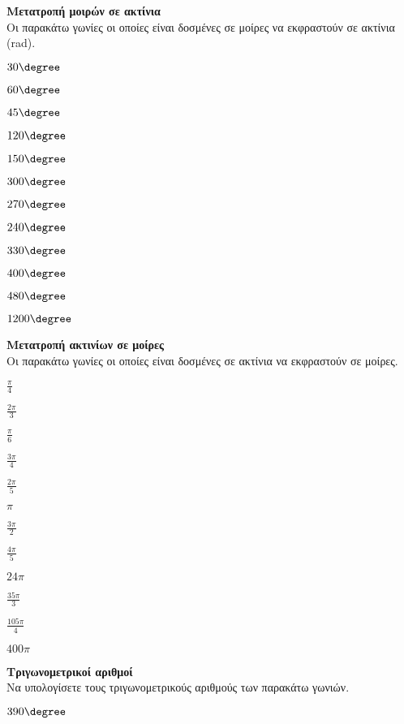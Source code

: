 \begin{multicols}{2}
\Askhsh \textbf{Μετατροπή μοιρών σε ακτίνια}\\
Οι παρακάτω γωνίες οι οποίες είναι δοσμένες σε μοίρες να εκφραστούν σε ακτίνια (rad).
\begin{multicols}{3}
\begin{rlist}
\item $ 30\degree $
\item $ 60\degree $
\item $ 45\degree $
\item $ 120\degree $
\item $ 150\degree $
\item $ 300\degree $
\item $ 270\degree $
\item $ 240\degree $
\item $ 330\degree $
\item $ 400\degree $
\item $ 480\degree $
\item $ 1200\degree $
\end{rlist}
\end{multicols}
\Askhsh \textbf{Μετατροπή ακτινίων σε μοίρες}\\
Οι παρακάτω γωνίες οι οποίες είναι δοσμένες σε ακτίνια να εκφραστούν σε μοίρες.
\begin{multicols}{3}
\begin{rlist}
\item $ \frac{\pi}{4} $
\item $ \frac{2\pi}{3} $
\item $ \frac{\pi}{6} $
\item $ \frac{3\pi}{4} $
\item $ \frac{2\pi}{5} $
\item $ \pi $
\item $ \frac{3\pi}{2} $
\item $ \frac{4\pi}{5} $
\item $ 24\pi $
\item $ \frac{35\pi}{3} $
\item $ \frac{105\pi}{4} $
\item $ 400\pi $
\end{rlist}
\end{multicols}
\Askhsh \textbf{Τριγωνομετρικοί αριθμοί}\\
Να υπολογίσετε τους τριγωνομετρικούς αριθμούς των παρακάτω γωνιών.
\begin{multicols}{3}
\begin{rlist}
\item $ 390\degree $

\end{rlist}
\end{multicols}
\end{multicols}
